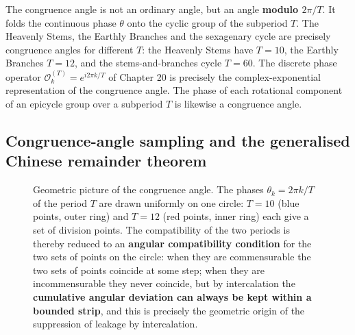 \begin{remark}\label{rem:congruence_angle_interpretation}
The congruence angle is not an ordinary angle, but an angle \textbf{modulo $2\pi/T$}. It folds the continuous phase $\theta$ onto the cyclic group of the subperiod $T$. The Heavenly Stems, the Earthly Branches and the sexagenary cycle are precisely congruence angles for different $T$: the Heavenly Stems have $T=10$, the Earthly Branches $T=12$, and the stems-and-branches cycle $T=60$. The discrete phase operator $\mathcal{O}_k^{(T)}=e^{i2\pi k/T}$ of Chapter 20 is precisely the complex-exponential representation of the congruence angle. The phase of each rotational component of an epicycle group over a subperiod $T$ is likewise a congruence angle.
\end{remark}

\subsection{Congruence-angle sampling and the generalised Chinese remainder theorem}

\begin{figure}[htbp]
\centering
{}
\caption{Geometric picture of the congruence angle. The phases $\theta_k = 2\pi k/T$ of the period $T$ are drawn uniformly on one circle: $T=10$ (blue points, outer ring) and $T=12$ (red points, inner ring) each give a set of division points. The compatibility of the two periods is thereby reduced to an \textbf{angular compatibility condition} for the two sets of points on the circle: when they are commensurable the two sets of points coincide at some step; when they are incommensurable they never coincide, but by intercalation the \textbf{cumulative angular deviation can always be kept within a bounded strip}, and this is precisely the geometric origin of the suppression of leakage by intercalation.}
\label{fig:congruence_angle_circle}
\end{figure}

